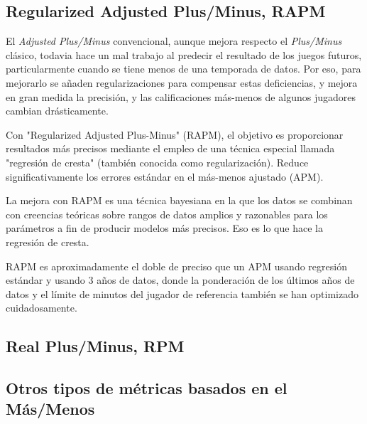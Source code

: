 \documentclass[paper=a4, fontsize=9pt]{article}
\begin{document}
\subsection{Regularized Adjusted Plus/Minus, RAPM}

El \emph{Adjusted Plus/Minus} convencional, aunque mejora respecto el \emph{Plus/Minus} clásico, todavia hace un mal trabajo al predecir el resultado de los juegos futuros, particularmente cuando se tiene menos de una temporada de datos. Por eso, para mejorarlo se añaden regularizaciones para compensar estas deficiencias, y mejora en gran medida la precisión, y las calificaciones más-menos de algunos jugadores cambian drásticamente.

Con "Regularized Adjusted Plus-Minus" (RAPM), el objetivo es proporcionar resultados más precisos mediante el empleo de una técnica especial llamada "regresión de cresta" (también conocida como regularización). Reduce significativamente los errores estándar en el más-menos ajustado (APM).

La mejora con RAPM es una técnica bayesiana en la que los datos se combinan con creencias teóricas sobre rangos de datos amplios y razonables para los parámetros a fin de producir modelos más precisos. Eso es lo que hace la regresión de cresta.

RAPM es aproximadamente el doble de preciso que un APM usando regresión estándar y usando 3 años de datos, donde la ponderación de los últimos años de datos y el límite de minutos del jugador de referencia también se han optimizado cuidadosamente.


\subsection{Real Plus/Minus, RPM}

\subsection{Otros tipos de métricas basados en el Más/Menos}
\end{document}
